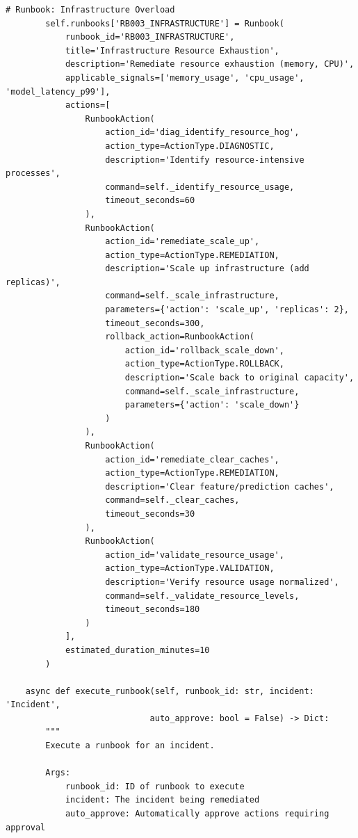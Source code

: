 \begin{lstlisting}[style=python, caption={Runbook automation with guided remediation}]
        # Runbook: Infrastructure Overload
        self.runbooks['RB003_INFRASTRUCTURE'] = Runbook(
            runbook_id='RB003_INFRASTRUCTURE',
            title='Infrastructure Resource Exhaustion',
            description='Remediate resource exhaustion (memory, CPU)',
            applicable_signals=['memory_usage', 'cpu_usage', 'model_latency_p99'],
            actions=[
                RunbookAction(
                    action_id='diag_identify_resource_hog',
                    action_type=ActionType.DIAGNOSTIC,
                    description='Identify resource-intensive processes',
                    command=self._identify_resource_usage,
                    timeout_seconds=60
                ),
                RunbookAction(
                    action_id='remediate_scale_up',
                    action_type=ActionType.REMEDIATION,
                    description='Scale up infrastructure (add replicas)',
                    command=self._scale_infrastructure,
                    parameters={'action': 'scale_up', 'replicas': 2},
                    timeout_seconds=300,
                    rollback_action=RunbookAction(
                        action_id='rollback_scale_down',
                        action_type=ActionType.ROLLBACK,
                        description='Scale back to original capacity',
                        command=self._scale_infrastructure,
                        parameters={'action': 'scale_down'}
                    )
                ),
                RunbookAction(
                    action_id='remediate_clear_caches',
                    action_type=ActionType.REMEDIATION,
                    description='Clear feature/prediction caches',
                    command=self._clear_caches,
                    timeout_seconds=30
                ),
                RunbookAction(
                    action_id='validate_resource_usage',
                    action_type=ActionType.VALIDATION,
                    description='Verify resource usage normalized',
                    command=self._validate_resource_levels,
                    timeout_seconds=180
                )
            ],
            estimated_duration_minutes=10
        )

    async def execute_runbook(self, runbook_id: str, incident: 'Incident',
                             auto_approve: bool = False) -> Dict:
        """
        Execute a runbook for an incident.

        Args:
            runbook_id: ID of runbook to execute
            incident: The incident being remediated
            auto_approve: Automatically approve actions requiring approval


\end{lstlisting}
